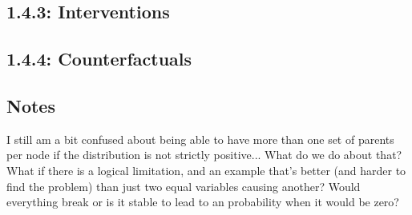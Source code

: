 \subsection{1.4.3: Interventions}

\subsection{1.4.4: Counterfactuals}

\subsection{Notes}

I still am a bit confused about being able to have more than one set of parents per node if the distribution is not strictly positive... What do we do about that? What if there is a logical limitation, and an example that's better (and harder to find the problem) than just two equal variables causing another? Would everything break or is it stable to lead to an  probability when it would be zero?
